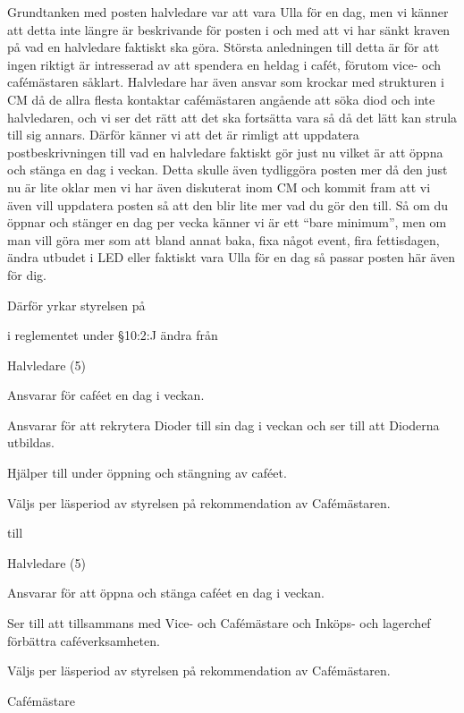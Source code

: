 \documentclass[../_main/handlingar.tex]{subfiles}
\begin{document}

Grundtanken med posten halvledare var att vara Ulla för en dag, men vi känner att detta inte längre är beskrivande för posten i och med att vi har sänkt kraven på vad en halvledare faktiskt ska göra. 
Största anledningen till detta är för att ingen riktigt är intresserad av att spendera en heldag i cafét, förutom vice- och cafémästaren såklart. 
Halvledare har även ansvar som krockar med strukturen i CM då de allra flesta kontaktar cafémästaren angående att söka diod och inte halvledaren, och vi ser det rätt att det ska fortsätta vara så då det lätt kan strula till sig annars. 
Därför känner vi att det är rimligt att uppdatera postbeskrivningen till vad en halvledare faktiskt gör just nu vilket är att öppna och stänga en dag i veckan. 
Detta skulle även tydliggöra posten mer då den just nu är lite oklar men vi har även diskuterat inom CM och kommit fram att vi även vill uppdatera posten så att den blir lite mer vad du gör den till. 
Så om du öppnar och stänger en dag per vecka känner vi är ett “bare minimum”, men om man vill göra mer som att bland annat baka, fixa något event, fira fettisdagen, ändra utbudet i LED eller faktiskt vara Ulla för en dag så passar posten här även för dig.

Därför yrkar styrelsen på

\begin{attsatser}
    \att i reglementet under \S10:2:J ändra från
    \begin{emptylist}
        \item Halvledare (5)
        \begin{dashlist}
            \item Ansvarar för caféet en dag i veckan. 
            \item Ansvarar för att rekrytera Dioder till sin dag i veckan och ser till att Dioderna utbildas.
            \item Hjälper till under öppning och stängning av caféet.
            \item Väljs per läsperiod av styrelsen på rekommendation av Cafémästaren.
        \end{dashlist}
    \end{emptylist}

    till

    \begin{emptylist}
        \item Halvledare (5)
        \begin{dashlist}
            \item Ansvarar för att öppna och stänga caféet en dag i veckan.
            \item Ser till att tillsammans med Vice- och Cafémästare och Inköps- och lagerchef förbättra caféverksamheten.
            \item Väljs per läsperiod av styrelsen på rekommendation av Cafémästaren.
        \end{dashlist}
    \end{emptylist}

\end{attsatser}

\begin{signatures}{1}
    \ist
    \signature{\cafem}{Cafémästare}
\end{signatures}
\end{document}
